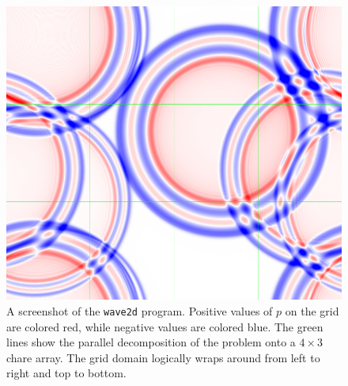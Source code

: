 \documentclass{article}
\begin{document}
\begin{figure}
\begin{center}
\includegraphics[width=5in]{screenshot}
\caption{A screenshot of the \texttt{wave2d} program. Positive values of $p$ on the grid are colored red, while negative values are colored blue. The green lines show the parallel decomposition of the problem onto a $4\times3$ chare array. The grid domain logically wraps around from left to right and top to bottom.
\label{screenshot}}
\end{center}
\end{figure} 
\end{document}
